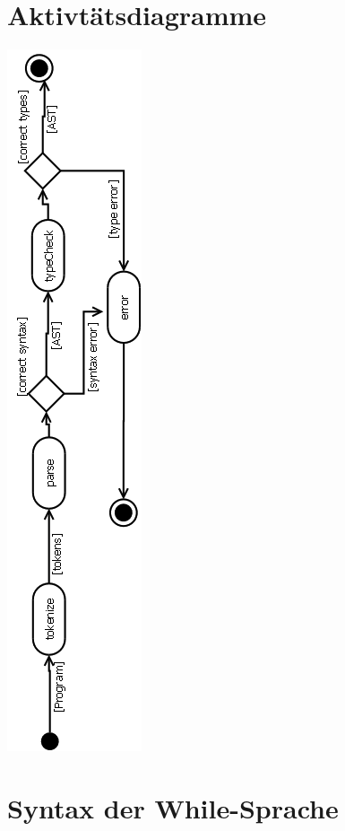 \documentclass[10pt,a4paper,titlepage]{article}
\begin{document}
\section{Aktivtätsdiagramme}
\newpage
\includegraphics[scale=0.65]{Aktivitaet}
\newpage
\section{Syntax der While-Sprache}
\end{document}

